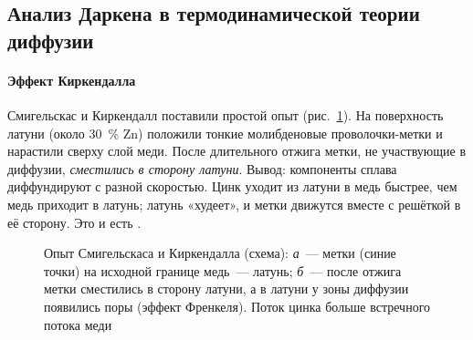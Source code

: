 \subsection{Анализ Даркена в термодинамической теории диффузии}\label{ssec:darken}

\paragraph{Эффект Киркендалла}
Смигельскас и Киркендалл поставили простой опыт
(рис.~\ref{fig:kirkendall}). На поверхность латуни (около 30~\% Zn)
положили тонкие молибденовые проволочки-метки и нарастили сверху слой
меди. После длительного отжига метки, не участвующие в диффузии,
\emph{сместились в сторону латуни}. Вывод: компоненты сплава
диффундируют с разной скоростью. Цинк уходит из латуни в медь быстрее,
чем медь приходит в латунь; латунь «худеет», и метки движутся вместе с
решёткой в её сторону. Это и есть .

\begin{figure}[ht]
\centering
{}
\caption{Опыт Смигельскаса и Киркендалла (схема): \textit{а}~— метки
(синие точки) на исходной границе медь~— латунь; \textit{б}~— после
отжига метки сместились в сторону латуни, а в латуни у зоны диффузии
появились поры (эффект Френкеля). Поток цинка больше встречного потока
меди}
\label{fig:kirkendall}
\end{figure}

